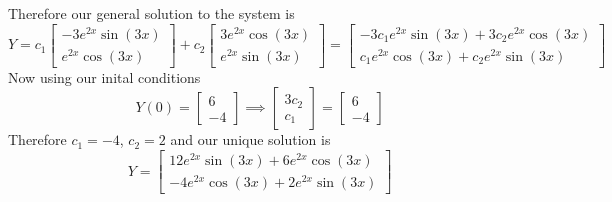 \documentclass[openany]{report}
\begin{document}
Therefore our general solution to the system is 
\[Y = c_1\begin{bmatrix}
    -3e^{2x}\sin(3x)\\
    e^{2x}\cos(3x)
\end{bmatrix} + c_2\begin{bmatrix}
    3e^{2x}\cos(3x)\\
    e^{2x}\sin(3x)
\end{bmatrix} = \begin{bmatrix}
    -3c_1e^{2x}\sin(3x) + 3c_2e^{2x}\cos(3x)\\
    c_1e^{2x}\cos(3x) + c_2e^{2x}\sin(3x)
\end{bmatrix}\]
Now using our inital conditions 
\[Y(0) = \begin{bmatrix}
    6\\
    -4
\end{bmatrix} \implies \begin{bmatrix}
    3c_2\\
    c_1
\end{bmatrix} = \begin{bmatrix}
    6\\
    -4
\end{bmatrix}\]
Therefore $c_1 = -4$, $c_2 = 2$ and our unique solution is 
\[Y = \begin{bmatrix}
    12e^{2x}\sin(3x)+6e^{2x}\cos(3x)\\
    -4e^{2x}\cos(3x) + 2e^{2x}\sin(3x)
\end{bmatrix}\]
\end{document}
